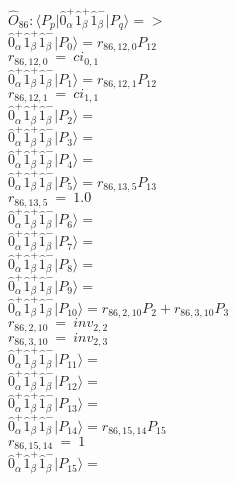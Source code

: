 \documentclass[14pt]{article}
\begin{document}
    $\hat{O}_{86}:  \langle{P_p}\vert \hat{0}_{\alpha}^{+}\hat{1}_{\beta}^{+}\hat{1}_{\beta}^{-} \vert{P_q}\rangle => $ \\ 
    $ \hat{0}_{\alpha}^{+}\hat{1}_{\beta}^{+}\hat{1}_{\beta}^{-} \vert{P_{0}}\rangle = {r}_{86,12,0}P_{12} $ \\ 
    ${r}_{86,12,0}\ =\ {ci}_{0,1} $ \\ 
    $ \hat{0}_{\alpha}^{+}\hat{1}_{\beta}^{+}\hat{1}_{\beta}^{-} \vert{P_{1}}\rangle = {r}_{86,12,1}P_{12} $ \\ 
    ${r}_{86,12,1}\ =\ {ci}_{1,1} $ \\ 
    $ \hat{0}_{\alpha}^{+}\hat{1}_{\beta}^{+}\hat{1}_{\beta}^{-} \vert{P_{2}}\rangle =  $ \\ 
    $ \hat{0}_{\alpha}^{+}\hat{1}_{\beta}^{+}\hat{1}_{\beta}^{-} \vert{P_{3}}\rangle =  $ \\ 
    $ \hat{0}_{\alpha}^{+}\hat{1}_{\beta}^{+}\hat{1}_{\beta}^{-} \vert{P_{4}}\rangle =  $ \\ 
    $ \hat{0}_{\alpha}^{+}\hat{1}_{\beta}^{+}\hat{1}_{\beta}^{-} \vert{P_{5}}\rangle = {r}_{86,13,5}P_{13} $ \\ 
    ${r}_{86,13,5}\ =\ 1.0 $ \\ 
    $ \hat{0}_{\alpha}^{+}\hat{1}_{\beta}^{+}\hat{1}_{\beta}^{-} \vert{P_{6}}\rangle =  $ \\ 
    $ \hat{0}_{\alpha}^{+}\hat{1}_{\beta}^{+}\hat{1}_{\beta}^{-} \vert{P_{7}}\rangle =  $ \\ 
    $ \hat{0}_{\alpha}^{+}\hat{1}_{\beta}^{+}\hat{1}_{\beta}^{-} \vert{P_{8}}\rangle =  $ \\ 
    $ \hat{0}_{\alpha}^{+}\hat{1}_{\beta}^{+}\hat{1}_{\beta}^{-} \vert{P_{9}}\rangle =  $ \\ 
    $ \hat{0}_{\alpha}^{+}\hat{1}_{\beta}^{+}\hat{1}_{\beta}^{-} \vert{P_{10}}\rangle = {r}_{86,2,10}P_{2}+{r}_{86,3,10}P_{3} $ \\ 
    ${r}_{86,2,10}\ =\ {inv}_{2,2} $ \\ 
    ${r}_{86,3,10}\ =\ {inv}_{2,3} $ \\ 
    $ \hat{0}_{\alpha}^{+}\hat{1}_{\beta}^{+}\hat{1}_{\beta}^{-} \vert{P_{11}}\rangle =  $ \\ 
    $ \hat{0}_{\alpha}^{+}\hat{1}_{\beta}^{+}\hat{1}_{\beta}^{-} \vert{P_{12}}\rangle =  $ \\ 
    $ \hat{0}_{\alpha}^{+}\hat{1}_{\beta}^{+}\hat{1}_{\beta}^{-} \vert{P_{13}}\rangle =  $ \\ 
    $ \hat{0}_{\alpha}^{+}\hat{1}_{\beta}^{+}\hat{1}_{\beta}^{-} \vert{P_{14}}\rangle = {r}_{86,15,14}P_{15} $ \\ 
    ${r}_{86,15,14}\ =\ 1 $ \\ 
    $ \hat{0}_{\alpha}^{+}\hat{1}_{\beta}^{+}\hat{1}_{\beta}^{-} \vert{P_{15}}\rangle =  $ \\ 
    
\end{document}
